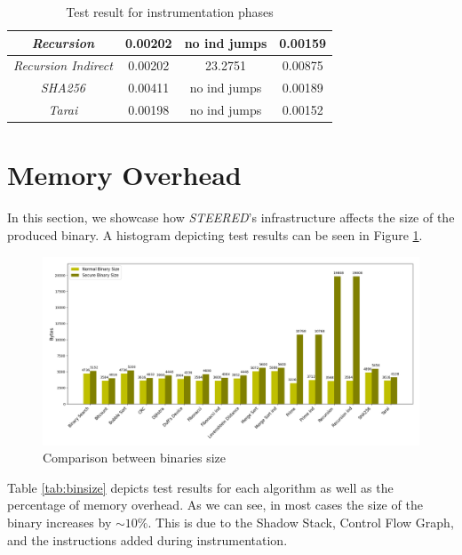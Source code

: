 \begin{table}
\begin{tabular}{|c|c|c|c|}
    \hline
    \textit{Recursion}                   & 0.00202                      & no ind jumps            & 0.00159                     \\
    \hline
    \textit{Recursion Indirect}          & 0.00202                      & 23.2751                 & 0.00875                     \\
    \hline
    \textit{SHA256}                      & 0.00411                      & no ind jumps            & 0.00189                     \\
    \hline
    \textit{Tarai}                       & 0.00198                      & no ind jumps            & 0.00152                     \\
    \hline
  \end{tabular}
  \caption{Test result for instrumentation phases}
  \label{tab:othertimes}
\end{table}

\section{Memory Overhead}
\label{sec:pa_memory}

In this section, we showcase how \textit{STEERED}'s infrastructure affects the
size of the produced binary. A histogram depicting test results can be seen in Figure
\ref{fig:binsize}.

\begin{figure}[htbp]
  \centering
  \includegraphics[width=\linewidth]{images/size.png}
  \caption{Comparison between binaries size}
  \label{fig:binsize}
\end{figure}

Table \ref{tab:binsize} depicts test results for each algorithm as well as the
percentage of memory overhead. As we can see, in most cases the size of the
binary increases by $\sim 10\%$. This is due to the Shadow Stack, Control Flow
Graph, and the instructions added during instrumentation.

